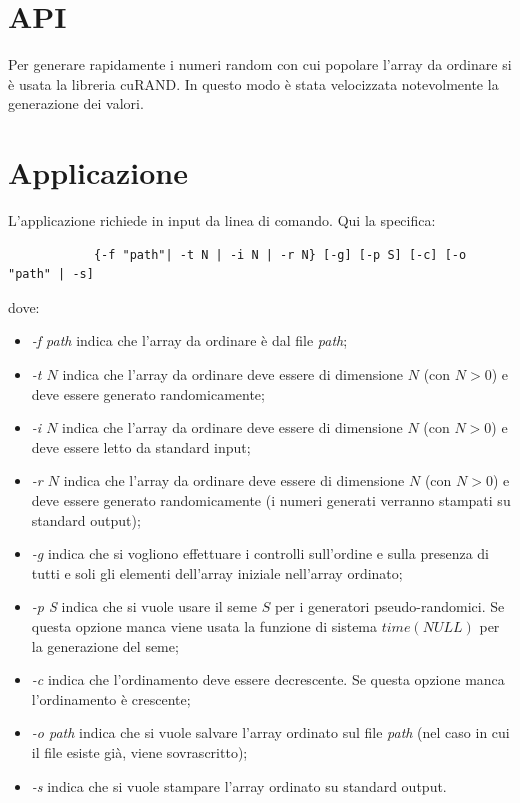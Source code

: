\documentclass[a4paper, 11pt]{article}
\begin{document}
	\section{API}
		Per generare rapidamente i numeri random con cui popolare l'array da ordinare si è usata la libreria cuRAND. In questo modo è stata
		velocizzata notevolmente la generazione dei valori. 
	\section{Applicazione}
		L'applicazione richiede in input da linea di comando. Qui la specifica: 
		\begin{verbatim}
			{-f "path"| -t N | -i N | -r N} [-g] [-p S] [-c] [-o "path" | -s]
		\end{verbatim}
		dove:
		\begin{itemize}
			\item \emph{-f path} indica che l'array da ordinare è dal file \emph{path};
			\item \emph{-t $N$} indica che l'array da ordinare deve essere di dimensione $N$ (con $N > 0$) e deve essere generato randomicamente;
			\item \emph{-i $N$} indica che l'array da ordinare deve essere di dimensione $N$ (con $N > 0$) e deve essere letto da standard input;
			\item \emph{-r $N$} indica che l'array da ordinare deve essere di dimensione $N$ (con $N > 0$) e deve essere generato randomicamente
			 	(i numeri generati verranno stampati su standard output);
			\item \emph{-g} indica che si vogliono effettuare i controlli sull'ordine e sulla presenza di tutti e soli gli elementi dell'array 
			iniziale nell'array ordinato;
			\item \emph{-p S} indica che si vuole usare il seme $S$ per i generatori pseudo-randomici. Se questa opzione manca viene
				usata la funzione di sistema $time(NULL)$ per la generazione del seme;
			\item \emph{-c} indica che l'ordinamento deve essere decrescente. Se questa opzione manca l'ordinamento è crescente;
			\item \emph{-o path} indica che si vuole salvare l'array ordinato sul file \emph{path} (nel caso in cui il file esiste già, viene 
				sovrascritto);
			\item \emph{-s} indica che si vuole stampare l'array ordinato su standard output.
		\end{itemize}
	
\end{document}

